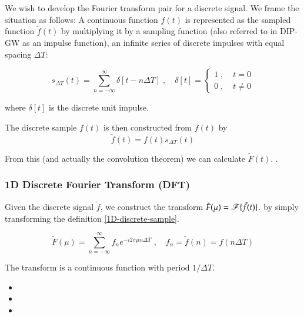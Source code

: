We wish to develop the Fourier transform pair for a discrete signal. We frame the situation
as follows: A continuous function $f(t)$  is represented as the sampled function $\tilde{f}(t)$ by multiplying it by a sampling function (also referred to
in DIP-GW as an impulse function), an infinite series of discrete impulses with equal spacing $\Delta T$:

\begin{equation} \label{1D-sampling-function}
s_{\Delta T}(t) = \sum_{n=-\infty}^{\infty} \delta[t - n\Delta T] \;,\quad
\delta[t] = \begin{cases} 1 \;,\; & t=0 \\ 0 \;,\;& t \ne 0 \end{cases}
\end{equation}

where $\delta[t]$ is the discrete unit impulse.

The discrete sample $f(t)$ is then constructed from $f(t)$ by
\begin{equation} \label{1D-discrete-sample}
\tilde{f}(t) = f(t) s_{\Delta T}(t)
\end{equation}

From this (and actually the convolution theorem) we can calculate $\tilde{F}(t)$. .

\subsubsection{1D Discrete Fourier Transform (DFT)}

Given the discrete signal $\tilde{f}$, we construct the transform
$\tilde{F}(\mu) = \operatorname{\mathscr{F}}\{\tilde{f}(t)\}$. by simply transforming the definition \cref{1D-discrete-sample}.


\begin{equation} \label{1D-DFT-transform}
\tilde{F}(\mu) = \sum_{n=-\infty}^{\infty} f_n e^{-i 2\pi \mu n \Delta T} \;,\quad
	f_n = \tilde{f}(n) = f(n\Delta T)
\end{equation}

The transform is a continuous function with period $1 / \Delta T$. 

	\begin{itemize}
		\item {}
		\item {}
		\item {}
	\end{itemize}
	
